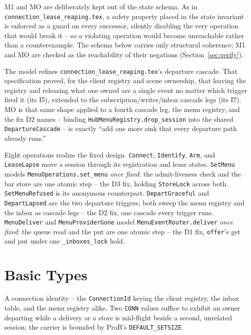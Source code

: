 \documentclass[a4paper,10pt,fleqn]{article}
\begin{document}
M1 and MO are deliberately kept out of the state schema. As in
\texttt{connection\_lease\_reaping.tex}, a safety property placed in the
state invariant is enforced as a guard on every successor, silently
disabling the very operation that would break it -- so a violating
operation would become unreachable rather than a counterexample. The schema
below carries only structural coherence; M1 and MO are checked as the
reachability of their negations (Section~\ref{sec:verify}).

The model refines \texttt{connection\_lease\_reaping.tex}'s departure
cascade. That specification proved, for the client registry and scene
ownership, that leaving the registry and releasing what one owned are a
single event no matter which trigger fired it (its I5), extended to the
subscription/writer/inbox cascade legs (its I7). MO is that same shape
applied to a fourth cascade leg, the menu registry, and the fix D2 names --
binding \texttt{HubMenuRegistry.drop\_session} into the shared
\texttt{DepartureCascade} -- is exactly ``add one more sink that every
departure path already runs.''

Eight operations realize the fixed design. \texttt{Connect},
\texttt{Identify}, \texttt{Arm}, and \texttt{LeaseLapse} move a session
through its registration and lease states. \texttt{SetMenu} models
\texttt{MenuOperations.set\_menu} \emph{once fixed}: the admit-liveness
check and the bar store are one atomic step -- the D3 fix, holding
\texttt{StoreLock} across both. \texttt{SetMenuRefused} is its anonymous
counterpart. \texttt{DepartGraceful} and \texttt{DepartLapsed} are the two
departure triggers; both sweep the menu registry and the inbox as cascade
legs -- the D2 fix, one cascade every trigger runs. \texttt{MenuDeliver}
and \texttt{MenuProviderGone} model \texttt{MenuEventRouter.deliver}
\emph{once fixed}: the queue read and the put are one atomic step -- the D1
fix, \texttt{offer}'s get and put under one \texttt{\_inboxes\_lock} hold.

\section{Basic Types}

\begin{zed}
  [CONN]
\end{zed}

A connection identity -- the \texttt{ConnectionId} keying the client
registry, the inbox table, and the menu registry alike. Two \texttt{CONN}
values suffice to exhibit an owner departing while a delivery or a store is
mid-flight beside a second, unrelated session; the carrier is bounded by
ProB's \texttt{DEFAULT\_SETSIZE}.
\end{document}
